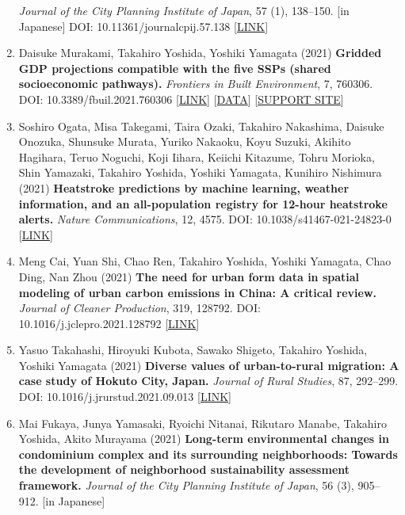 \documentclass[
]{book}
\begin{document}
\begin{enumerate}
  \emph{Journal of the City Planning Institute of Japan}, 57 (1), 138--150. {[}in Japanese{]}
  DOI: 10.11361/journalcpij.57.138 {[}\href{https://doi.org/10.11361/journalcpij.57.138}{LINK}{]}
\item
  Daisuke Murakami, Takahiro Yoshida, Yoshiki Yamagata (2021)
  \textbf{Gridded GDP projections compatible with the five SSPs (shared socioeconomic pathways).}
  \emph{Frontiers in Built Environment}, 7, 760306.
  DOI: 10.3389/fbuil.2021.760306 {[}\href{https://www.frontiersin.org/articles/10.3389/fbuil.2021.760306/abstract}{LINK}{]} {[}\href{https://figshare.com/articles/dataset/Gridded_GDP_projections_compatible_with_the_five_SSPs_Shared_Socioeconomic_Pathways_/12016506/1}{DATA}{]}
  {[}\href{https://gcp-tsukuba.github.io/SSP-downscale/}{SUPPORT SITE}{]}
\item
  Soshiro Ogata, Misa Takegami, Taira Ozaki, Takahiro Nakashima, Daisuke Onozuka, Shunsuke Murata, Yuriko Nakaoku, Koyu Suzuki, Akihito Hagihara, Teruo Noguchi, Koji Iihara, Keiichi Kitazume, Tohru Morioka, Shin Yamazaki, Takahiro Yoshida, Yoshiki Yamagata, Kunihiro Nishimura (2021)
  \textbf{Heatstroke predictions by machine learning, weather information, and an all-population registry for 12-hour heatstroke alerts.}
  \emph{Nature Communications}, 12, 4575.
  DOI: 10.1038/s41467-021-24823-0 {[}\href{https://www.nature.com/articles/s41467-021-24823-0}{LINK}{]}
\item
  Meng Cai, Yuan Shi, Chao Ren, Takahiro Yoshida, Yoshiki Yamagata, Chao Ding, Nan Zhou (2021)
  \textbf{The need for urban form data in spatial modeling of urban carbon emissions in China: A critical review.}
  \emph{Journal of Cleaner Production}, 319, 128792.
  DOI: 10.1016/j.jclepro.2021.128792 {[}\href{https://doi.org/10.1016/j.jclepro.2021.128792}{LINK}{]}
\item
  Yasuo Takahashi, Hiroyuki Kubota, Sawako Shigeto, Takahiro Yoshida, Yoshiki Yamagata (2021)
  \textbf{Diverse values of urban-to-rural migration: A case study of Hokuto City, Japan.}
  \emph{Journal of Rural Studies}, 87, 292--299.
  DOI: 10.1016/j.jrurstud.2021.09.013 {[}\href{https://www.sciencedirect.com/science/article/abs/pii/S0743016721002771}{LINK}{]}
\item
  Mai Fukaya, Junya Yamasaki, Ryoichi Nitanai, Rikutaro Manabe, Takahiro Yoshida, Akito Murayama (2021)
  \textbf{Long-term environmental changes in condominium complex and its surrounding neighborhoods: Towards the development of neighborhood sustainability assessment framework.}
  \emph{Journal of the City Planning Institute of Japan}, 56 (3), 905--912. {[}in Japanese{]}

\end{enumerate}
\end{document}
